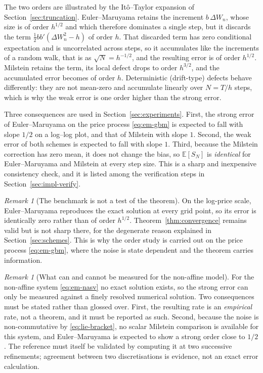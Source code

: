 \documentclass[11pt,a4paper]{article}
\theoremstyle{definition}
\theoremstyle{remark}
\newtheorem{remark}[theorem]{Remark}
\begin{document}
The two orders are illustrated by the It\^o--Taylor expansion of Section~\ref{sec:truncation}. Euler--Maruyama retains the increment $b\,\Delta W_n$, whose size is of order $h^{1/2}$ and which therefore dominates a single step, but it discards the term $\tfrac12 b b'(\Delta W_n^2 - h)$ of order $h$. That discarded term has zero conditional expectation and is uncorrelated across steps, so it accumulates like the increments of a random walk, that is as $\sqrt{N} = h^{-1/2}$, and the resulting error is of order $h^{1/2}$. Milstein retains the term, its local defect drops to order $h^{3/2}$, and the accumulated error becomes of order $h$. Deterministic (drift-type) defects behave differently: they are not mean-zero and accumulate linearly over $N = T/h$ steps, which is why the weak error is one order higher than the strong error.

Three consequences are used in Section~\ref{sec:experiments}. First, the strong error of Euler--Maruyama on the price process \eqref{eq:em-gbm} is expected to fall with slope $1/2$ on a log--log plot, and that of Milstein with slope $1$. Second, the weak error of both schemes is expected to fall with slope $1$. Third, because the Milstein correction has zero mean, it does not change the bias, so $\mathbb{E}[S_N]$ is \emph{identical} for Euler--Maruyama and Milstein at every step size. This is a sharp and inexpensive consistency check, and it is listed among the verification steps in Section~\ref{sec:impl-verify}.

\begin{remark}[The benchmark is not a test of the theorem]
\label{rem:exact-on-log}
On the log-price scale, Euler--Maruyama reproduces the exact solution at every grid point, so its error is identically zero rather than of order $h^{1/2}$. Theorem~\ref{thm:convergence} remains valid but is not sharp there, for the degenerate reason explained in Section~\ref{sec:schemes}. This is why the order study is carried out on the price process \eqref{eq:em-gbm}, where the noise is state dependent and the theorem carries information.
\end{remark}

\begin{remark}[What can and cannot be measured for the non-affine model]
\label{rem:empirical}
For the non-affine system \eqref{eq:em-nasv} no exact solution exists, so the strong error can only be measured against a finely resolved numerical solution. Two consequences must be stated rather than glossed over. First, the resulting rate is an \emph{empirical} rate, not a theorem, and it must be reported as such. Second, because the noise is non-commutative by \eqref{eq:lie-bracket}, no scalar Milstein comparison is available for this system, and Euler--Maruyama is expected to show a strong order close to $1/2$. The reference must itself be validated by computing it at two successive refinements; agreement between two discretisations is evidence, not an exact error calculation.
\end{remark}
\end{document}
